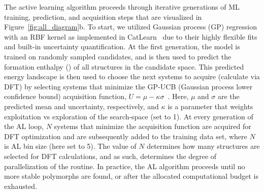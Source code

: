 %
%
The active learning algorithm proceeds through iterative generations of ML training, prediction, and acquisition steps that are visualized in Figure~\ref{fig:all_diagram}b.
%
To start, we utilized Gaussian process (GP) regression with an RBF kernel as implemented in CatLearn~\cite{hansen2019atomistic,CatLearn_Repo} due to their highly flexible fits and built-in uncertainty quantification.
%
%
At the first generation, the model is trained on randomly sampled candidates,
and is then used to predict the formation enthalpy (\DHf) of all structures in the candidate space.
%
This predicted energy landscape is then used to choose the next systems to acquire (calculate via DFT) by selecting systems that minimize the GP-UCB (Gaussian process lower confidence bound) acquisition function,
$U = \mu - \kappa \sigma$~\cite{Cox1992}.
%
Here, $\mu$ and $\sigma$ are the predicted \DHf mean and uncertainty, respectively,
and $\kappa$ is a parameter that weights exploitation vs exploration of the search-space (set to 1).
%
At every generation of the AL loop, $N$ systems that minimize the acquisition function are acquired for DFT optimization and are subsequently added to the training data set, where $N$ is AL bin size (here set to 5).
%
The value of $N$ determines how many structures are selected for DFT calculations,
and as such, determines the degree of parallelization of the routine.
%
%
%
In practice, the AL algorithm proceeds until no more stable polymorphs are found, or after the allocated computational budget is exhausted.


